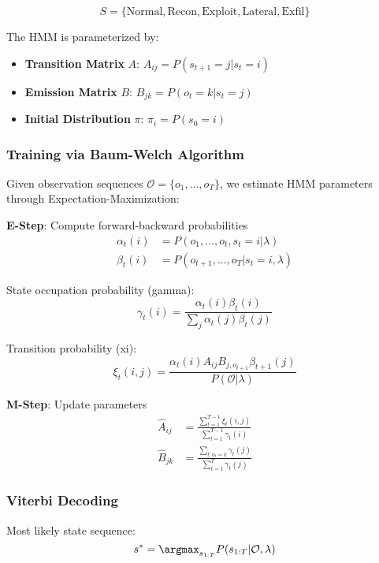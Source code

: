 \documentclass[conference]{IEEEtran}
\begin{document}
\begin{equation}
S = \{\text{Normal}, \text{Recon}, \text{Exploit}, \text{Lateral}, \text{Exfil}\}
\end{equation}

The HMM is parameterized by:
\begin{itemize}
    \item \textbf{Transition Matrix} $A$: $A_{ij} = P(s_{t+1}=j | s_t=i)$
    \item \textbf{Emission Matrix} $B$: $B_{jk} = P(o_t=k | s_t=j)$
    \item \textbf{Initial Distribution} $\pi$: $\pi_i = P(s_0=i)$
\end{itemize}

\subsubsection{Training via Baum-Welch Algorithm}
Given observation sequences $\mathcal{O} = \{o_1, ..., o_T\}$, we estimate HMM parameters through Expectation-Maximization:

\textbf{E-Step}: Compute forward-backward probabilities
\begin{align}
\alpha_t(i) &= P(o_1,...,o_t, s_t=i | \lambda) \\
\beta_t(i) &= P(o_{t+1},...,o_T | s_t=i, \lambda)
\end{align}

State occupation probability (gamma):
\begin{equation}
\gamma_t(i) = \frac{\alpha_t(i)\beta_t(i)}{\sum_j \alpha_t(j)\beta_t(j)}
\end{equation}

Transition probability (xi):
\begin{equation}
\xi_t(i,j) = \frac{\alpha_t(i) A_{ij} B_{j,o_{t+1}} \beta_{t+1}(j)}{P(\mathcal{O}|\lambda)}
\end{equation}

\textbf{M-Step}: Update parameters
\begin{align}
\hat{A}_{ij} &= \frac{\sum_{t=1}^{T-1} \xi_t(i,j)}{\sum_{t=1}^{T-1} \gamma_t(i)} \\
\hat{B}_{jk} &= \frac{\sum_{t:o_t=k} \gamma_t(j)}{\sum_{t=1}^{T} \gamma_t(j)}
\end{align}

\subsubsection{Viterbi Decoding}
Most likely state sequence:
\begin{equation}
s^* = \argmax_{s_{1:T}} P(s_{1:T} | \mathcal{O}, \lambda)
\end{equation}
\end{document}
